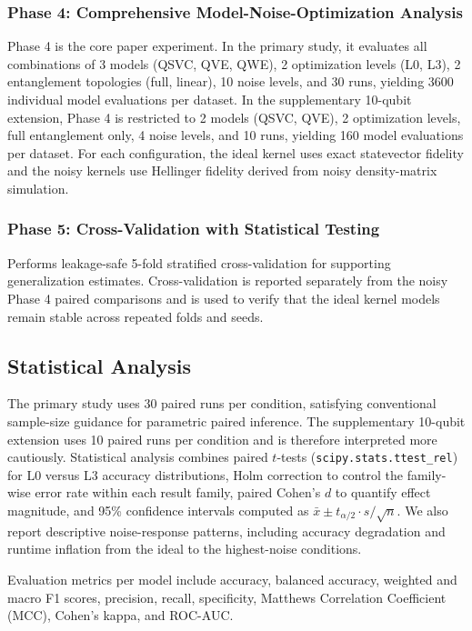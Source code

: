 \documentclass{ieeeaccess}
\begin{document}
\subsubsection{Phase 4: Comprehensive Model-Noise-Optimization Analysis}
Phase 4 is the core paper experiment. In the primary study, it evaluates all combinations of 3 models (QSVC, QVE, QWE), 2 optimization levels (L0, L3), 2 entanglement topologies (full, linear), 10 noise levels, and 30 runs, yielding 3600 individual model evaluations per dataset. In the supplementary 10-qubit extension, Phase 4 is restricted to 2 models (QSVC, QVE), 2 optimization levels, full entanglement only, 4 noise levels, and 10 runs, yielding 160 model evaluations per dataset. For each configuration, the ideal kernel uses exact statevector fidelity and the noisy kernels use Hellinger fidelity derived from noisy density-matrix simulation.

\subsubsection{Phase 5: Cross-Validation with Statistical Testing}
Performs leakage-safe 5-fold stratified cross-validation for supporting generalization estimates. Cross-validation is reported separately from the noisy Phase 4 paired comparisons and is used to verify that the ideal kernel models remain stable across repeated folds and seeds.

\subsection{Statistical Analysis}
\label{sec:statistics}

The primary study uses 30 paired runs per condition, satisfying conventional sample-size guidance for parametric paired inference. The supplementary 10-qubit extension uses 10 paired runs per condition and is therefore interpreted more cautiously. Statistical analysis combines paired $t$-tests (\texttt{scipy.stats.ttest\_rel}) for L0 versus L3 accuracy distributions, Holm correction to control the family-wise error rate within each result family, paired Cohen's $d$ to quantify effect magnitude, and 95\% confidence intervals computed as $\bar{x} \pm t_{\alpha/2} \cdot s / \sqrt{n}$. We also report descriptive noise-response patterns, including accuracy degradation and runtime inflation from the ideal to the highest-noise conditions.

Evaluation metrics per model include accuracy, balanced accuracy, weighted and macro F1 scores, precision, recall, specificity, Matthews Correlation Coefficient (MCC), Cohen's kappa, and ROC-AUC.
\end{document}
